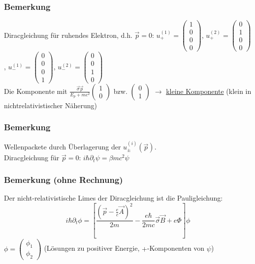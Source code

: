 \documentclass[twoside,a4paper]{scrartcl}
\renewcommand{\1}{\mathds{1}}
\newcommand{\ra}{\rightarrow}
\begin{document}
\subsubsection*{Bemerkung}
Diracgleichung für ruhendes Elektron, d.h. $\vec p=0$:
$u_+^{(1)}=\begin{pmatrix}1 \\ 0 \\ 0 \\ 0\end{pmatrix}$, $u_+^{(2)}=\begin{pmatrix}0 \\ 1 \\ 0 \\ 0\end{pmatrix}$, $u_-^{(1)}=\begin{pmatrix}0 \\ 0 \\ 0 \\1\end{pmatrix}$, $u_-^{(2)}=\begin{pmatrix}0 \\ 0 \\ 1 \\ 0\end{pmatrix}$\\
Die Komponente mit $\frac{\vec \sigma \vec p}{E_p+mc^2} \begin{pmatrix}1 \\ 0 \end{pmatrix}$ bzw. $\begin{pmatrix}0 \\ 1 \end{pmatrix}$ $\ra$ \underline{kleine Komponente} (klein in nichtrelativistischer Näherung)
\subsubsection*{Bemerkung}
Wellenpackete durch Überlagerung der $u_\pm^{(i)}(\vec p)$.\\
Diracgleichung für $\vec p=0$: $i\hbar \partial_t \psi=\beta mc^2 \psi$
\subsubsection*{Bemerkung (ohne Rechnung)}
 Der nicht-relativistische Limes der Diracgleichung ist die Pauligleichung:
$$i \hbar \partial_t \phi=[\frac{(\vec p -\frac{e}{c}\vec A)^2}{2m}-\frac{e \hbar}{2mc}\vec \sigma \vec B+e\Phi]\phi$$
$\phi=\begin{pmatrix}\phi_1 \\ \phi_2\end{pmatrix}$ (Lösungen zu positiver Energie, $+$-Komponenten von $\psi$)
\end{document}
